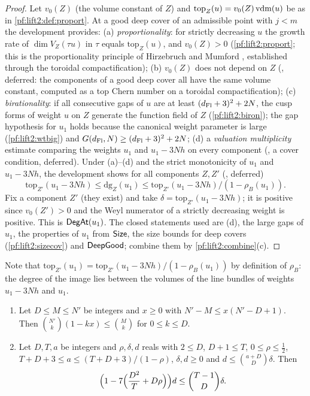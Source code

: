 \begin{proof}
Let $v_0(Z)$ (the volume constant of $Z$) and $\mathrm{top}_Z(u)=v_0(Z)\operatorname{vdm}(u)$ be as in
\cref{pf:lift2:def:proport}. At a good deep cover of an admissible point with $j<m$ the development provides:
(a) \emph{proportionality}: for strictly decreasing $u$ the growth rate of $\dim V_Z(\tau u)$ in $\tau$ equals
$\mathrm{top}_Z(u)$, and $v_0(Z)>0$ (\cref{pf:lift2:proport}; this is the proportionality principle of Hirzebruch and
Mumford \cite{Mumford1977}, established through the toroidal compactification);
(b) $v_0(Z)$ does not depend on $Z$ (, deferred: the components of a good deep cover
all have the same volume constant, computed as a top Chern number on a toroidal compactification);
(c) \emph{birationality}: if all consecutive gaps of $u$ are at least $(d_{\mathrm{Fl}}+3)^2+2N$, the cusp forms of weight $u$
on $Z$ generate the function field of $Z$ (\cref{pf:lift2:biron}); the gap hypothesis for $u_1$ holds because the
canonical weight parameter is large (\cref{pf:lift2:wtbig}) and $G(d_{\mathrm{Fl}},N)\ge(d_{\mathrm{Fl}}+3)^2+2N$;
(d) a \emph{valuation multiplicity} estimate comparing the weights $u_1$ and $u_1-3Nh$ on every component
(, a cover condition, deferred).
Under (a)--(d) and the strict monotonicity of $u_1$ and $u_1-3Nh$, the development shows for all components
$Z,Z'$ (, deferred)
\[
\mathrm{top}_{Z'}(u_1-3Nh)\le\mathrm{dg}_Z(u_1)\le\mathrm{top}_{Z'}(u_1-3Nh)/(1-\rho_B(u_1)).
\]
Fix a component $Z'$ (they exist) and take $\delta=\mathrm{top}_{Z'}(u_1-3Nh)$; it is positive since $v_0(Z')>0$ and
the Weyl numerator of a strictly decreasing weight is positive. This is $\mathsf{DegAt}(u_1)$. The closed statements
used are (d), the large gaps of $u_1$, the properties of $u_1$ from $\mathsf{Size}$, the size bounds for deep
covers (\cref{pf:lift2:sizecov}) and $\mathsf{DeepGood}$; combine them by \cref{pf:lift2:combine}(c).
\end{proof}

Note that $\mathrm{top}_{Z'}(u_1)=\mathrm{top}_{Z'}(u_1-3Nh)/(1-\rho_B(u_1))$ by definition of $\rho_B$: the degree of
the image lies between the volumes of the line bundles of weights $u_1-3Nh$ and $u_1$.

\begin{lemma}\label{pf:lift2:binom}
\begin{enumerate}[label=(\alph*)]
\item Let $D\le M\le N'$ be integers and $x\ge0$ with $N'-M\le x(N'-D+1)$. Then
$\binom{N'}{k}(1-kx)\le\binom Mk$ for $0\le k\le D$.
\item Let $D,T,a$ be integers and $\rho,\delta,d$ reals with $2\le D$, $D+1\le T$, $0\le\rho\le\frac12$,
$T+D+3\le a\le(T+D+3)/(1-\rho)$, $\delta,d\ge0$ and $d\le\binom{a+D}D\delta$. Then
\[
\Bigl(1-7\Bigl(\frac{D^2}T+D\rho\Bigr)\Bigr)d\le\binom{T-1}D\delta.
\]
\end{enumerate}
\end{lemma}

